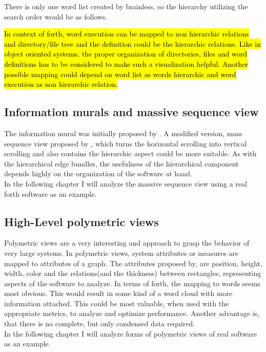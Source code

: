 

There is only one word list created by brainless, so the hierarchy utilizing the search order would be as follows.


\hl{In context of forth, word execution can be mapped to non hierarchic relations and directory/file tree and the definition could be the hierarchic relations. Like in object oriented systems, the proper organization of directories, files and word definitions has to be considered to make such a visualization helpful.
Another possible mapping could depend on word list as words hierarchic and word execution as non hierarchic relation.}

\subsection*{Information murals and massive sequence view}
The information mural was initially proposed by \cite{Jerding:1998:IMT:614271.614408}. A modified version, mass sequence view proposed by \cite{Cornelissen2009}, which turns the horizontal scrolling into vertical scrolling and also contains the hierarchic aspect could be more suitable. As with the hierarchical edge bundles, the usefulness of the hierarchical component depends highly on the organization of the software at hand.
\\
In the following chapter I will analyze the massive sequence view using a real forth software as an example.

\subsection*{High-Level polymetric views}
Polymetric views\cite{Ducasse:2004:HPV:977397.977739} are a very interesting and approach to grasp the behavior of very large systems. In polymetric views, system attributes or measures are mapped to attributes of a graph. The attributes proposed by\cite{Ducasse:2004:HPV:977397.977739}, are position, height, width, color and the relations(and the thickness) between rectangles, representing aspects of the software to analyze. In terms of forth, the mapping to words seems most obvious. This would result in some kind of a word cloud with more information attached. This could be most valuable, when used with the appropriate metrics, to analyze and optimize performance. Another advantage is, that there is no complete, but  only condensed data required.
\\
In the following chapter I will analyze forms of polymetric views of real software as an example.

